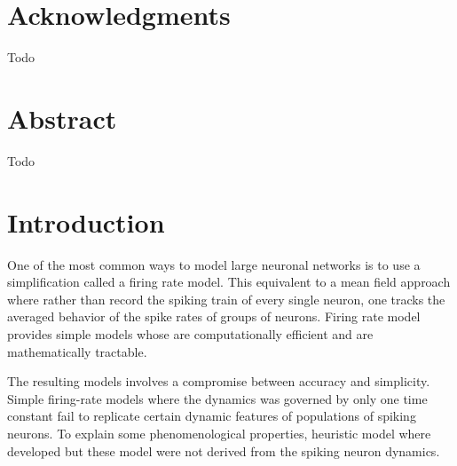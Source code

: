 \documentclass[12pt,twoside]{report}
\begin{document}
\newpage\null\thispagestyle{empty}\newpage

\chapter*{Acknowledgments}
\thispagestyle{empty}
Todo


\newpage\null\thispagestyle{empty}\newpage


\chapter*{Abstract}
\thispagestyle{empty}
Todo



\clearpage\newpage\null\thispagestyle{empty}\newpage


\tableofcontents
\thispagestyle{empty}


\newpage\null\thispagestyle{empty}\newpage




\chapter{Introduction}
\setcounter{page}{1}

\label{sec:intro}


One of the most common ways to model large neuronal networks is to use a simplification called a firing rate model.  This equivalent to a mean field approach where rather than record the spiking train of every single neuron, one tracks the averaged behavior of the spike rates of groups of neurons. Firing rate model provides simple models whose are computationally efficient and are mathematically tractable. 

The resulting models involves a compromise between accuracy and simplicity. Simple
firing-rate models where the dynamics was governed by only one time constant fail to replicate certain dynamic features of populations of spiking neurons. To explain some phenomenological properties, heuristic model where developed but these model were not derived from the spiking neuron dynamics. 
\end{document}

